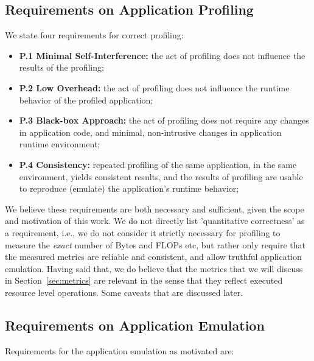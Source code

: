 \documentclass[10pt, conference, compsocconf]{IEEEtran}
\newcommand{\B}[1]{\textbf{#1}\xspace}
\newcommand{\I}[1]{\textit{#1}\xspace}
\newenvironment{shortlist}{
  \begin{itemize}
}{
  \end{itemize}
}
\begin{document}
 \subsection{Requirements on Application Profiling}
 \label{sec:prof_req}

  We state four requirements for correct profiling:

  \begin{shortlist}

    \item \B{P.1 Minimal Self-Interference:} the act of profiling does
        not influence the results of the profiling; 

    \item \B{P.2 Low Overhead:} the act of profiling does not
        influence the runtime behavior of the profiled application;

    \item \B{P.3 Black-box Approach:} the act of profiling does not
        require any changes in application code, and minimal,
        non-intrusive changes in application runtime environment;

    \item \B{P.4 Consistency:} repeated profiling of the same
        application, in the same environment, yields consistent
        results, and the results of profiling are usable to reproduce
        (emulate) the application's runtime behavior;
        
  \end{shortlist}

  We believe these requirements are both necessary and sufficient, given the
  scope and motivation of this work.  We do not directly list 'quantitative
  correctness' as a requirement, i.e., we do not consider it strictly necessary
  for profiling to measure the \I{exact} number of Bytes and FLOPs etc, but
  rather only require that the measured metrics are reliable and consistent, and
  allow truthful application emulation.  Having said that, we do believe that
  the metrics that we will discuss in Section~\ref{sec:metrics} are relevant in
  the sense that they reflect executed resource level operations. Some caveats
  that are discussed later.

 \subsection{Requirements on Application Emulation}
 \label{sec:emu_req}

 Requirements for the application emulation as motivated are:
\end{document}
